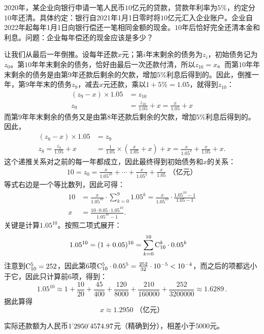 \documentclass[12pt,UTF8]{ctexbook}
\begin{document}
\begin{et}
    2020年，某企业向银行申请一笔人民币$10$亿元的贷款，贷款年利率为$5\%$，约定分$10$年还清。具体约定：银行自2021年1月1日零时将$10$亿元汇入企业账户。企业自2022年起每年1月1日向银行偿还一笔相同金额的现金。$10$年后恰好完全还清本金和利息。问题：企业每年偿还的现金应该是多少？
\end{et}
\begin{so}
    让我们从最后一年倒推。设每年还款$x$元；第$i$年末剩余的债务为$z_i$，初始债务记为$z_0$。第$10$年年末剩余的债务，恰好由最后一次还款付清，所以$z_{10} = x$。而第$10$年年末剩余的债务是由第$9$年还款后剩余的欠款，增加$5\%$利息后得到的。因此，倒推一年，第$9$年年末的债务$z_9$，减去$x$元还款，乘以$1+5\%=1.05$，就得到$z_{10}$：
    \begin{align*}
        (z_9 - x) \times 1.05 &= z_{10} \\
        z_9 &= \frac{z_{10}}{1.05} + x = \frac{x}{1.05} + x
    \end{align*}
    而第$9$年年末剩余的债务又是由第$8$年还款后剩余的欠款，增加$5\%$利息后得到的。因此，
    \begin{align*}
        (z_8 - x) \times 1.05 &= z_{9} \\
        z_8 = \frac{z_9}{1.05} + x &= \frac{1}{1.05} \times \left(\frac{x}{1.05} + x\right) + x = \frac{x}{1.05^2} + \frac{x}{1.05} + x.
    \end{align*}
    这个递推关系对之前的每一年都成立，因此最终得到初始债务和$x$的关系：
    \begin{align*}
        10 = z_0 = \frac{x}{1.05^{10}} + \cdots + \frac{x}{1.05^2} + \frac{x}{1.05} \,\,\mbox{（亿元）} \tag{注意：最初不需要还钱}
    \end{align*}
    等式右边是一个等比数列，因此可得：
    \begin{align*}
        10 &= \frac{x}{1.05^{10}}\cdot \sum_{k=0}^{9} 1.05^k = \frac{x}{1.05^{10}}\cdot \frac{1.05^{10} - 1}{1.05 - 1} \\
        x &= \frac{10\cdot 0.05 \cdot 1.05^{10}}{1.05^{10} - 1} .
    \end{align*}
    关键是计算$1.05^{10}$。按照二项式展开：
    \begin{align*}
        1.05^{10} &= (1 + 0.05)^{10} = \sum_{k=0}^{10} \mathrm{C}_{10}^{k}\cdot 0.05^{k}
    \end{align*}
    注意到$\mathrm{C}_{10}^{5} = 252$，因此第$6$项$\mathrm{C}_{10}^{5}\cdot 0.05^5 = \frac{252}{32} \cdot 10^{-5} < 10^{-4}$，而之后的项都远小于它，因此只计算前$6$项，得到：
    $$ 1.05^{10} \approx 1 + \frac{10}{20} + \frac{45}{400} + \frac{120}{8000} + \frac{210}{160000} + \frac{252}{3200000} \approx 1.6289\, .$$
    据此算得
    $$ x \approx 1.2950\,\,\mbox{（亿元）}$$
\end{so}
实际还款额为人民币$1\dlim{2950}\dlim{4574}.97$元（精确到分），相差小于$5000$元。
\end{document}
